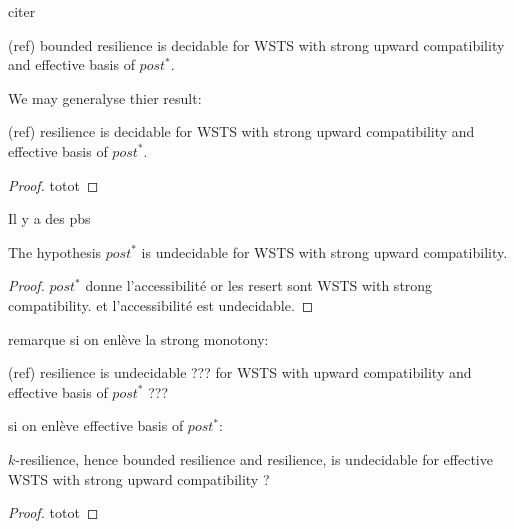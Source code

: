 


citer 


\begin{theorem}(ref)
{\sc bounded resilience} is decidable for WSTS with strong upward compatibility and effective basis of $post^*$.
\end{theorem}

We may generalyse thier result:

\begin{theorem}(ref)
{\sc resilience} is decidable for WSTS with strong upward compatibility and effective basis of $post^*$.
\end{theorem}


\begin{proof}
totot
\end{proof}

Il y a des pbs

\begin{proposition}
The hypothesis $post^*$ is undecidable for WSTS with strong upward compatibility.
\end{proposition}


\begin{proof}
$post^*$ donne l'accessibilité or les resert sont WSTS with strong compatibility. et l'accessibilité est undecidable.
\end{proof}

remarque si on enlève la strong monotony:


\begin{theorem}(ref)
{\sc resilience} is undecidable ??? for WSTS with upward compatibility and effective basis of $post^*$ ???
\end{theorem}

si on enlève effective basis of $post^*$:

\begin{proposition}
{\sc $k$-resilience}, hence {\sc bounded resilience} and {\sc resilience}, is undecidable for effective WSTS with strong upward compatibility ?
\end{proposition}

\begin{proof}
totot
\end{proof}




